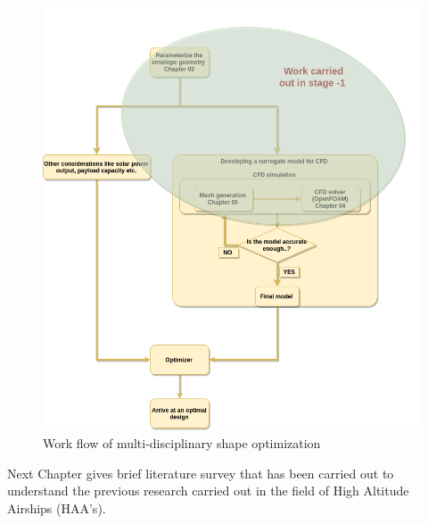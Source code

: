 \begin{figure}[htbp]
	\includegraphics[width=\textwidth]{layout/layout.png} 
	\caption{Work flow of multi-disciplinary shape optimization}
	\label{Report layout} %
\end{figure}
Next Chapter gives brief literature survey that has been carried out to understand the previous research carried out in the field of High Altitude Airships (HAA's).





